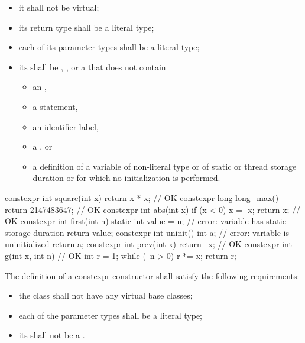 \begin{itemize}
\item
it shall not be virtual;

\item
its return type shall be a literal type;

\item
each of its parameter types shall be a literal type;

\item
its  shall be
, , or
a 
that does not contain

\begin{itemize}
\item an ,
\item a  statement,
\item an identifier label,
\item a , or
\item a definition of a variable
of non-literal type or
of static or thread storage duration or
for which no initialization is performed.
\end{itemize}

\end{itemize}

\begin{example}
\begin{codeblock}
constexpr int square(int x)
  { return x * x; }             // OK
constexpr long long_max()
  { return 2147483647; }        // OK
constexpr int abs(int x) {
  if (x < 0)
    x = -x;
  return x;                     // OK
}
constexpr int first(int n) {
  static int value = n;         // error: variable has static storage duration
  return value;
}
constexpr int uninit() {
  int a;                        // error: variable is uninitialized
  return a;
}
constexpr int prev(int x)
  { return --x; }               // OK
constexpr int g(int x, int n) { // OK
  int r = 1;
  while (--n > 0) r *= x;
  return r;
}
\end{codeblock}
\end{example}

\pnum
{}%
The definition of a constexpr constructor shall satisfy the
following requirements:
\begin{itemize}
\item
the class shall not have any virtual base classes;

\item
each of the parameter types shall be a literal type;

\item
its  shall not be a .
\end{itemize}

